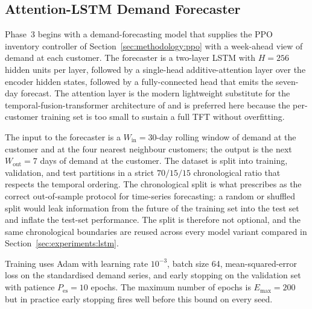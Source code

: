 \documentclass[review,preprint,authoryear,12pt]{elsarticle}
\begin{document}
\subsection{Attention-LSTM Demand Forecaster}
\label{sec:methodology:lstm}

Phase~3 begins with a demand-forecasting model that supplies the PPO
inventory controller of Section~\ref{sec:methodology:ppo} with a
week-ahead view of demand at each customer. The forecaster is a
two-layer LSTM \citep{hochreiter1997lstm} with $H = 256$ hidden units
per layer, followed by a single-head additive-attention layer over
the encoder hidden states, followed by a fully-connected head that
emits the seven-day forecast. The attention layer is the modern
lightweight substitute for the temporal-fusion-transformer
architecture of \citet{lim2021tft} and is preferred here because the
per-customer training set is too small to sustain a full TFT without
overfitting.

The input to the forecaster is a $W_{\text{in}} = 30$-day rolling
window of demand at the customer and at the four nearest neighbour
customers; the output is the next $W_{\text{out}} = 7$ days of demand
at the customer. The dataset is split into training, validation, and
test partitions in a strict $70/15/15$ chronological ratio that
respects the temporal ordering. The chronological split is what
\citet{tashman2000oos} prescribes as the correct out-of-sample
protocol for time-series forecasting: a random or shuffled split
would leak information from the future of the training set into the
test set and inflate the test-set performance. The split is therefore
not optional, and the same chronological boundaries are reused across
every model variant compared in
Section~\ref{sec:experiments:lstm}.

Training uses Adam with learning rate $10^{-3}$, batch size 64,
mean-squared-error loss on the standardised demand series, and early
stopping on the validation set with patience $P_{\text{es}} = 10$
epochs. The maximum number of epochs is $E_{\max} = 200$ but in
practice early stopping fires well before this bound on every seed.
\end{document}
